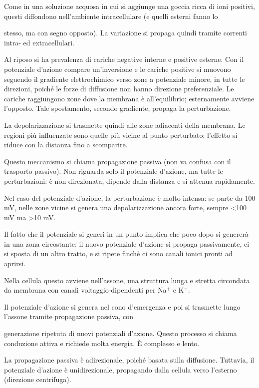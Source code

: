 \documentclass[12pt,a4paper,openany]{book}
\begin{document}
Come in una soluzione acquosa in cui si aggiunge una goccia ricca di ioni positivi, questi diffondono nell'ambiente intracellulare (e quelli esterni fanno lo

stesso, ma con segno opposto). La variazione si propaga quindi tramite correnti intra- ed extracellulari.

Al riposo si ha prevalenza di cariche negative interne e positive esterne. Con il potenziale d'azione compare un'inversione e le cariche positive si muovono seguendo il gradiente elettrochimico verso zone a potenziale minore, in tutte le direzioni, poiché le forze di diffusione non hanno direzione preferenziale. Le cariche raggiungono zone dove la membrana è all'equilibrio; esternamente avviene l'opposto. Tale spostamento, secondo gradiente, propaga la perturbazione.

La depolarizzazione si trasmette quindi alle zone adiacenti della membrana. Le regioni più influenzate sono quelle più vicine al punto perturbato; l'effetto si riduce con la distanza fino a scomparire.

Questo meccanismo si chiama propagazione passiva (non va confusa con il trasporto passivo). Non riguarda solo il potenziale d'azione, ma tutte le perturbazioni: è non direzionata, dipende dalla distanza e si attenua rapidamente.

Nel caso del potenziale d'azione, la perturbazione è molto intensa: se parte da 100 mV, nelle zone vicine si genera una depolarizzazione ancora forte, sempre <100 mV ma >10 mV.

Il fatto che il potenziale si generi in un punto implica che poco dopo si genererà in una zona circostante: il nuovo potenziale d'azione si propaga passivamente, ci si sposta di un altro tratto, e si ripete finché ci sono canali ionici pronti ad aprirsi.

Nella cellula questo avviene nell'assone, una struttura lunga e stretta circondata da membrana con canali voltaggio-dipendenti per Na$^{+}$ e K$^{+}$.

Il potenziale d'azione si genera nel cono d'emergenza e poi si trasmette lungo l'assone tramite propagazione passiva, con

generazione ripetuta di nuovi potenziali d'azione. Questo processo si chiama conduzione attiva e richiede molta energia. È complesso e lento.

La propagazione passiva è adirezionale, poiché basata sulla diffusione. Tuttavia, il potenziale d'azione è unidirezionale, propagando dalla cellula verso l'esterno (direzione centrifuga).
\end{document}
